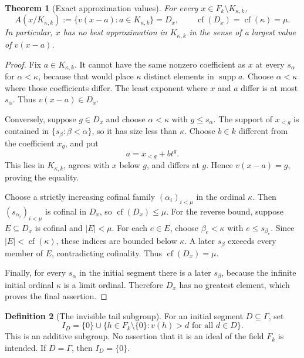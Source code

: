 \documentclass[11pt,letterpaper]{article}
\numberwithin{equation}{section}
\newtheorem{theorem}{Theorem}[section]
\theoremstyle{definition}
\newtheorem{definition}[theorem]{Definition}
\theoremstyle{remark}
\newcommand{\supp}{\operatorname{supp}}
\newcommand{\cf}{\operatorname{cf}}
\newcommand{\K}{K_{\kappa,k}}
\begin{document}
\begin{theorem}[Exact approximation values]\label{fkc:thm:approx}
For every $x\in F_k\setminus\K$,
\begin{equation}\label{fkc:eq:Aexact}
 A(x/\K):=\{v(x-a):a\in\K\}=D_x,
 \qquad \cf(D_x)=\cf(\kappa)=\mu.
\end{equation}
In particular, $x$ has no best approximation in $\K$ in the sense of a largest value of $v(x-a)$.
\end{theorem}
\begin{proof}
Fix $a\in\K$. It cannot have the same nonzero coefficient as $x$ at every $s_\alpha$ for $\alpha<\kappa$, because that would place $\kappa$ distinct elements in $\supp a$. Choose $\alpha<\kappa$ where those coefficients differ. The least exponent where $x$ and $a$ differ is at most $s_\alpha$. Thus $v(x-a)\in D_x$.

Conversely, suppose $g\in D_x$ and choose $\alpha<\kappa$ with $g\le s_\alpha$. The support of $x_{<g}$ is contained in $\{s_\beta:\beta<\alpha\}$, so it has size less than $\kappa$. Choose $b\in k$ different from the coefficient $x_g$, and put
\[
 a=x_{<g}+b t^g.
\]
This lies in $\K$, agrees with $x$ below $g$, and differs at $g$. Hence $v(x-a)=g$, proving the equality.

Choose a strictly increasing cofinal family $(\alpha_i)_{i<\mu}$ in the ordinal $\kappa$. Then $(s_{\alpha_i})_{i<\mu}$ is cofinal in $D_x$, so $\cf(D_x)\le\mu$. For the reverse bound, suppose $E\subseteq D_x$ is cofinal and $|E|<\mu$. For each $e\in E$, choose $\beta_e<\kappa$ with $e\le s_{\beta_e}$. Since $|E|<\cf(\kappa)$, these indices are bounded below $\kappa$. A later $s_\beta$ exceeds every member of $E$, contradicting cofinality. Thus $\cf(D_x)=\mu$.

Finally, for every $s_\alpha$ in the initial segment there is a later $s_\beta$, because the infinite initial ordinal $\kappa$ is a limit ordinal. Therefore $D_x$ has no greatest element, which proves the final assertion.
\end{proof}

\begin{definition}[The invisible tail subgroup]
For an initial segment $D\subseteq\Gamma$, set
\begin{equation}\label{fkc:eq:ID}
 I_D=\{0\}\cup\{h\in F_k\setminus\{0\}:v(h)>d\text{ for all }d\in D\}.
\end{equation}
This is an additive subgroup. No assertion that it is an ideal of the field $F_k$ is intended. If $D=\Gamma$, then $I_D=\{0\}$.
\end{definition}
\end{document}
